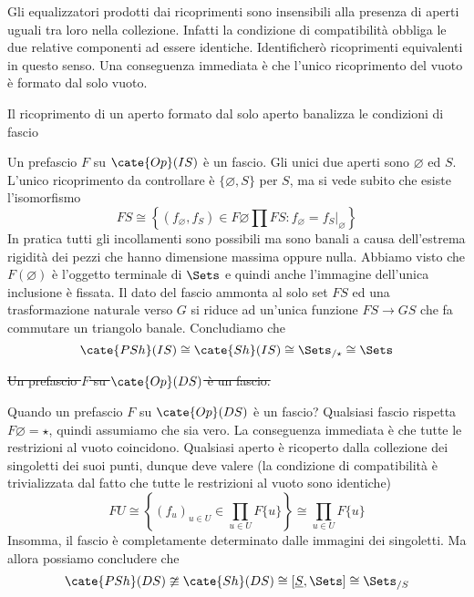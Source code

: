 {\oss Gli equalizzatori prodotti dai ricoprimenti sono insensibili alla presenza di aperti uguali tra loro nella collezione. Infatti la condizione di compatibilità obbliga le due relative componenti ad essere identiche. Identificherò ricoprimenti equivalenti in questo senso. Una conseguenza immediata è che l'unico ricoprimento del vuoto è formato dal solo vuoto.}

{\oss Il ricoprimento di un aperto formato dal solo aperto banalizza le condizioni di fascio}

Un prefascio $F$ su $\cate{Op}(IS)$ è un fascio.
Gli unici due aperti sono $\varnothing$ ed $S$.
L'unico ricoprimento da controllare è $\{\varnothing,S\}$ per $S$, ma si vede subito che esiste l'isomorfismo
\[
FS
\cong
\left\{
(f_\varnothing,f_S) \in F\varnothing\prod FS
\colon
f_\varnothing = f_S\vert_\varnothing
\right\}
\]
In pratica tutti gli incollamenti sono possibili ma sono banali a causa dell'estrema rigidità dei pezzi che hanno dimensione massima oppure nulla.
Abbiamo visto che $F(\varnothing)$ è l'oggetto terminale di $\Sets$ e quindi anche l'immagine dell'unica inclusione è fissata.
Il dato del fascio ammonta al solo set $FS$ ed una trasformazione naturale verso $G$ si riduce ad un'unica funzione $FS\to GS$ che fa commutare un triangolo banale.
Concludiamo che
\[ \cate{PSh}(IS) \cong \cate{Sh}(IS) \cong \Sets_{/\star} \cong \Sets \]

\sout{Un prefascio $F$ su $\cate{Op}(DS)$ è un fascio.}

Quando un prefascio $F$ su $\cate{Op}(DS)$ è un fascio?
Qualsiasi fascio rispetta $F\varnothing=\star$, quindi assumiamo che sia vero.
La conseguenza immediata è che tutte le restrizioni al vuoto coincidono.
Qualsiasi aperto è ricoperto dalla collezione dei singoletti dei suoi punti, dunque deve valere (la condizione di compatibilità è trivializzata dal fatto che tutte le restrizioni al vuoto sono identiche)
\[
FU
\cong
\left\{
(f_u)_{u\in U} \in \prod_{u\in U} F \{u\}
\right\}
\cong \prod_{u\in U} F \{u\}
\]
Insomma, il fascio è completamente determinato dalle immagini dei singoletti.
Ma allora possiamo concludere che
\[ \cate{PSh}(DS) \ncong \cate{Sh}(DS) \cong [\underline{S},\Sets] \cong \Sets_{/S} \]

